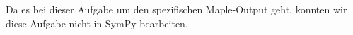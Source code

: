 \section{}

Da es bei dieser Aufgabe um den spezifischen Maple-Output geht, konnten wir diese Aufgabe nicht in SymPy bearbeiten.
